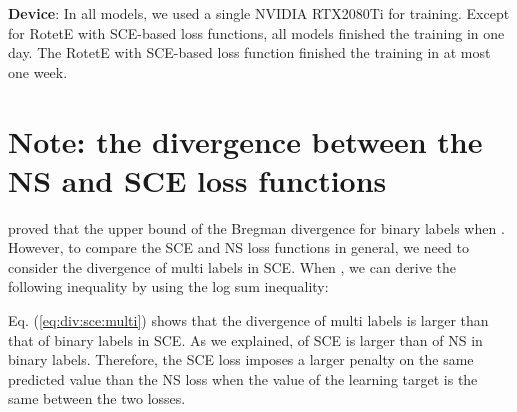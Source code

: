 \noindent\textbf{Device}: In all models, we used a single NVIDIA RTX2080Ti for training. Except for RotetE with SCE-based loss functions, all models finished the training in one day.
The RotetE with SCE-based loss function finished the training in at most one week.

\clearpage
\section{Note: the divergence between the NS and SCE loss functions}
\label{app:proof:bound}
\citet{8930624} proved that the upper bound of the Bregman divergence for binary labels when . However, to compare the SCE and NS loss functions in general, we need to consider the divergence of multi labels in SCE.
When , we can derive the following inequality by using the log sum inequality:

Eq. (\ref{eq:div:sce:multi}) shows that the divergence of multi labels is larger than that of binary labels in SCE.
As we explained,  of SCE is larger than  of NS in binary labels.
Therefore, the SCE loss imposes a larger penalty on the same predicted value than the NS loss when the value of the learning target is the same between the two losses.